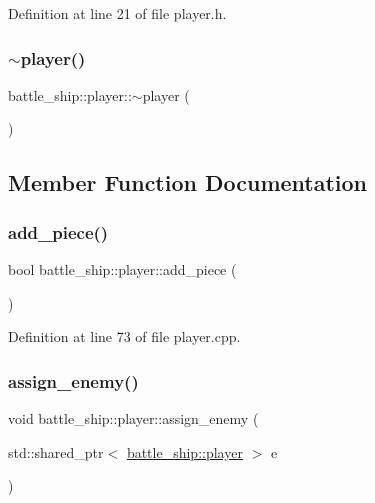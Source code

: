 Definition at line 21 of file player.\+h.

\mbox{\label{classbattle__ship_1_1player_afbb6b6e880864bf7a36f21a95665a6c7}} 
\subsubsection{\texorpdfstring{$\sim$player()}{~player()}}
{\footnotesize\ttfamily battle\+\_\+ship\+::player\+::$\sim$player (\begin{DoxyParamCaption}{ }\end{DoxyParamCaption})\hspace{0.3cm}{\ttfamily [default]}}



\subsection{Member Function Documentation}
\mbox{\label{classbattle__ship_1_1player_a704897da96d9e2d956bb75fc73c84508}} 
\subsubsection{\texorpdfstring{add\+\_\+piece()}{add\_piece()}}
{\footnotesize\ttfamily bool battle\+\_\+ship\+::player\+::add\+\_\+piece (\begin{DoxyParamCaption}{ }\end{DoxyParamCaption})}



Definition at line 73 of file player.\+cpp.

\mbox{\label{classbattle__ship_1_1player_ada39f5a20a89ffdf7218108a7dbe47c0}} 
\subsubsection{\texorpdfstring{assign\+\_\+enemy()}{assign\_enemy()}}
{\footnotesize\ttfamily void battle\+\_\+ship\+::player\+::assign\+\_\+enemy (\begin{DoxyParamCaption}\item[{std\+::shared\+\_\+ptr$<$ \hyperlink{classbattle__ship_1_1player}{battle\+\_\+ship\+::player} $>$}]{e }\end{DoxyParamCaption})\hspace{0.3cm}{\ttfamily [inline]}}



